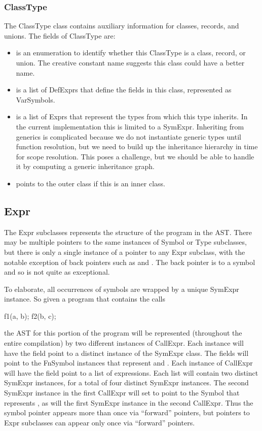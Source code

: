 \documentclass[10pt]{article}
\begin{document}
\subsubsection{ClassType}
\label{sec:classtype}

The ClassType class contains auxiliary information for classes,
records, and unions.  The fields of ClassType are:
\begin{itemize}
\item {} is an enumeration to identify whether
  this ClassType is a class, record, or union.  The creative constant
  name  suggests this class could have a better name.
\item {} is a list of DefExprs that define the fields
  in this class, represented as VarSymbols.
\item {} is a list of Exprs that represent the types
  from which this type inherits.  In the current implementation this
  is limited to a SymExpr.  Inheriting from generics is complicated
  because we do not instantiate generic types until function
  resolution, but we need to build up the inheritance hierarchy in
  time for scope resolution.  This poses a challenge, but we should be
  able to handle it by computing a generic inheritance graph.
\item {} points to the outer class if this is an inner
  class.
\end{itemize}

\subsection{Expr}

The Expr subclasses represents the structure of the program in the
AST.  There may be multiple pointers to the same instances of Symbol
or Type subclasses, but there is only a single instance of a pointer
to any Expr subclass, with the notable exception of back pointers such
as  and .  The back pointer
 is to a symbol and so is not quite as exceptional.

To elaborate, all occurrences of symbols are wrapped by a unique
SymExpr instance.  So given a program that contains the calls
\begin{chapel}
f1(a, b);
f2(b, c);
\end{chapel}
the AST for this portion of the program will be represented
(throughout the entire compilation) by two different instances of
CallExpr.  Each instance will have the  field point to a
distinct instance of the SymExpr class.  The  fields will
point to the FnSymbol instances that represent  and
.  Each instance of CallExpr will have the  field
point to a list of expressions.  Each list will contain two distinct
SymExpr instances, for a total of four distinct SymExpr instances.
The second SymExpr instance in the first CallExpr will set  to
point to the Symbol that represents , as will the first
SymExpr instance in the second CallExpr.  Thus the symbol pointer
appears more than once via ``forward'' pointers, but pointers to Expr
subclasses can appear only once via ``forward'' pointers.
\end{document}
